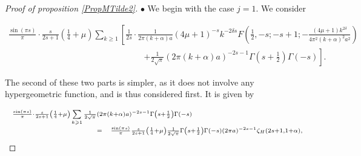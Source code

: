\documentclass{jams-l}
\theoremstyle{definition}
\theoremstyle{remark}
\numberwithin{equation}{section}
\begin{document}
\begin{proof}[Proof of proposition \ref{PropMTilde2}]
                    \medskip
                    
                    \hspace{10pt} $\bullet$ We begin with the case $j = 1$. We consider
                    
                        \begin{equation}   
                        \label{EqArcsinhTermJ1}
                            \begin{array}{l}
                                \scriptstyle \frac{\sin \left( \pi s \right)}{\pi} \cdot \frac{s}{2s+1} \left( \frac{1}{4} + \mu \right) \sum\limits_{k \geqslant 1} \left[ \frac{1}{2s} \cdot \frac{1}{2 \pi \left( k + \alpha \right) a} \left( 4 \mu + 1 \right)^{-s} k^{- 2 \delta s} F \left( \frac{1}{2}, -s; -s+1; - \frac{\left( 4 \mu + 1 \right) k^{2 \delta}}{4 \pi^2 \left( k + \alpha \right)^2 a^2} \right) \right. \\[1em]
                                
                                \qquad \qquad \qquad \qquad \qquad \qquad \qquad \qquad \left. \scriptstyle + \frac{1}{2 \sqrt{\pi}} \left( 2 \pi \left( k + \alpha \right) a \right)^{- 2 s - 1} \Gamma \left( s + \frac{1}{2} \right) \Gamma \left( -s \right) \right].
                            \end{array}
                        \end{equation}
                        
                        \noindent The second of these two parts is simpler, as it does not involve any hypergeometric function, and is thus considered first. It is given by
                        
                        \[ \begin{array}{lll}
                                \multicolumn{3}{l}{\scriptstyle \frac{\sin \left( \pi s \right)}{\pi} \cdot \frac{s}{2s+1} \left( \frac{1}{4} + \mu \right) \sum\limits_{k \geqslant 1} \frac{1}{2 \sqrt{\pi}} \left( 2 \pi \left( k + \alpha \right) a \right)^{- 2 s - 1} \Gamma \left( s + \frac{1}{2} \right) \Gamma \left( -s \right)} \\[0.5em]
                                
                                \qquad \qquad \qquad \qquad \quad & \scriptstyle = & \scriptstyle \frac{\sin \left( \pi s \right)}{\pi} \frac{s}{2s+1} \left( \frac{1}{4} + \mu \right) \frac{1}{2 \sqrt{\pi}} \Gamma \left( s + \frac{1}{2} \right) \Gamma \left( -s \right) \left( 2 \pi a \right)^{-2s-1} \zeta_H \left( 2s+1, 1+\alpha \right),
                            \end{array} \]
                        

\end{proof}
\end{document}
